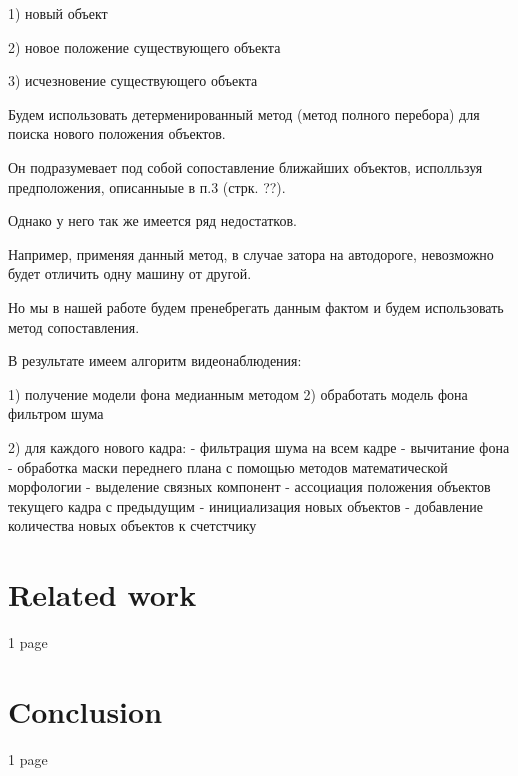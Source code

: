 \documentclass[12pt,a4paper,oneside,titlepage]{article}
\begin{document}
1) новый объект

2) новое положение существующего объекта

3) исчезновение существующего объекта

Будем использовать детерменированный метод (метод полного перебора) для поиска нового положения объектов.

Он подразумевает под собой сопоставление ближайших объектов, исполльзуя предположения, описанныые в п.3 (стрк. ??).

Однако у него так же имеется ряд недостатков.

Например, применяя данный метод, в случае затора на автодороге, невозможно будет отличить одну машину от другой.

Но мы в нашей работе будем пренебрегать данным фактом и будем использовать метод сопоставления.

В результате имеем алгоритм видеонаблюдения:

1) получение модели фона медианным методом
2) обработать модель фона фильтром шума

2) для каждого нового кадра:
- фильтрация шума на всем кадре
- вычитание фона
- обработка маски переднего плана с помощью методов математической морфологии
- выделение связных компонент
- ассоциация положения объектов текущего кадра с предыдущим
- инициализация новых объектов
- добавление количества новых объектов к счетстчику









\newpage
\section*{Related work}
1 page

\newpage
\section*{Conclusion}
1 page


\newpage
\renewcommand\refname{Bibliography}


\end{document}
